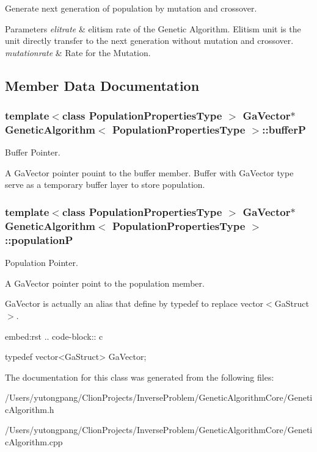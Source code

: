 Generate next generation of population by mutation and crossover. 


\begin{DoxyParams}{Parameters}
{\em elitrate} & elitism rate of the Genetic Algorithm. Elitism unit is the unit directly transfer to the next generation without mutation and crossover. \\
\hline
{\em mutationrate} & Rate for the Mutation. \\
\hline
\end{DoxyParams}


\subsection{Member Data Documentation}
\subsubsection[{bufferP}]{\setlength{\rightskip}{0pt plus 5cm}template$<$class Population\+Properties\+Type $>$ Ga\+Vector$\ast$ {\bf Genetic\+Algorithm}$<$ Population\+Properties\+Type $>$\+::bufferP}\hypertarget{class_genetic_algorithm_a74fdd6b9b2303018db89e0ad0eb77f02}{}\label{class_genetic_algorithm_a74fdd6b9b2303018db89e0ad0eb77f02}


Buffer Pointer. 

A Ga\+Vector pointer pouint to the buffer member. Buffer with Ga\+Vector type serve as a temporary buffer layer to store population. 
\subsubsection[{populationP}]{\setlength{\rightskip}{0pt plus 5cm}template$<$class Population\+Properties\+Type $>$ Ga\+Vector$\ast$ {\bf Genetic\+Algorithm}$<$ Population\+Properties\+Type $>$\+::populationP}\hypertarget{class_genetic_algorithm_a9ee5cb78bbc30596bceccb14143ec8e8}{}\label{class_genetic_algorithm_a9ee5cb78bbc30596bceccb14143ec8e8}


Population Pointer. 

A Ga\+Vector pointer point to the population member.

Ga\+Vector is actually an alias that define by {\ttfamily typedef} to replace {\ttfamily vector$<$Ga\+Struct$>$}. \begin{DoxyVerb}embed:rst
.. code-block:: c

  typedef vector<GaStruct> GaVector;
\end{DoxyVerb}
 

The documentation for this class was generated from the following files\+:\begin{DoxyCompactItemize}
\item 
/\+Users/yutongpang/\+Clion\+Projects/\+Inverse\+Problem/\+Genetic\+Algorithm\+Core/Genetic\+Algorithm.\+h\item 
/\+Users/yutongpang/\+Clion\+Projects/\+Inverse\+Problem/\+Genetic\+Algorithm\+Core/Genetic\+Algorithm.\+cpp\end{DoxyCompactItemize}
